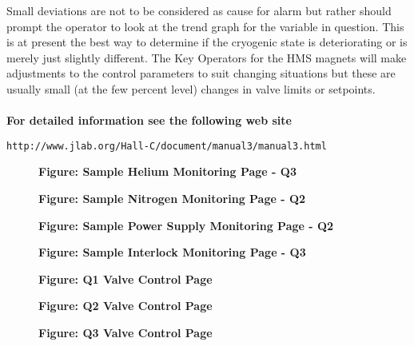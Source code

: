 \documentclass[12pt,epsf,here]{article}
\begin{document}
Small deviations are not to be considered as cause for alarm but rather
should prompt the operator to look at the trend graph for the variable in
question. This is at present the best way to determine if the cryogenic
state is deteriorating or is merely just slightly different. The Key
Operators for the HMS magnets will make adjustments to the control
parameters to suit changing situations but these are usually small (at the
few percent level) changes in valve limits or setpoints.\\
\\
\textbf{For detailed information see the following web site}\\
\begin{verbatim}http://www.jlab.org/Hall-C/document/manual3/manual3.html \end{verbatim}


\begin{figure}[htbp]
\centerline{ \epsfysize=15cm  }
\textbf{Figure: Sample Helium Monitoring Page - Q3} 
\end{figure}

\begin{figure}[htbp]
\centerline{ \epsfysize=10cm  }
\textbf{Figure: Sample Nitrogen Monitoring Page - Q2 }
\end{figure}

\begin{figure}[htbp]
\centerline{ \epsfysize=10cm  }
\textbf{Figure: Sample Power Supply Monitoring Page - Q2 }
\end{figure}

\begin{figure}[htbp]
\centerline{ \epsfysize=10cm  }
\textbf{Figure: Sample Interlock Monitoring Page - Q3  }
\end{figure}



\begin{figure}[htbp]
\centerline{ \epsfysize=10cm  }
\textbf{ Figure: Q1 Valve Control Page }  
\end{figure}

\begin{figure}[htbp]
\centerline{ \epsfysize=10cm  }
\textbf{Figure: Q2 Valve Control Page }
\end{figure}

\begin{figure}[htbp]
\centerline{ \epsfysize=10cm  }
\textbf{ Figure: Q3 Valve Control Page }
\end{figure}
\end{document}
